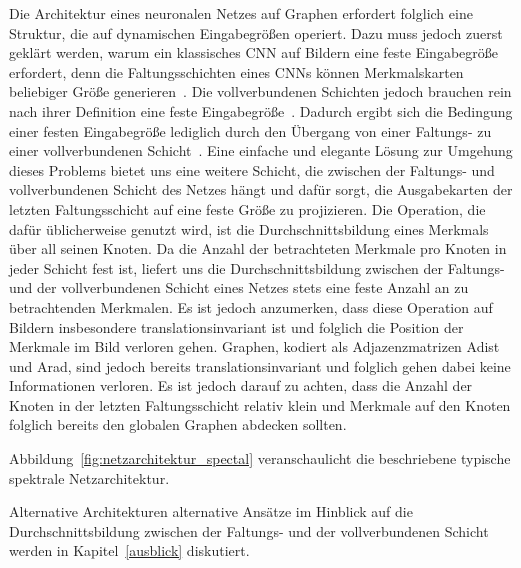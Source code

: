Die Architektur eines neuronalen Netzes auf Graphen erfordert folglich eine Struktur, die auf dynamischen Eingabegrößen operiert.
Dazu muss jedoch zuerst geklärt werden, warum ein klassisches \gls{CNN} auf Bildern eine feste Eingabegröße erfordert, denn die Faltungsschichten eines \glspl{CNN} können Merkmalskarten beliebiger Größe generieren~\cite{spp}.
Die vollverbundenen Schichten jedoch brauchen rein nach ihrer Definition eine feste Eingabegröße~\cite{spp}.
Dadurch ergibt sich die Bedingung einer festen Eingabegröße lediglich durch den Übergang von einer Faltungs- zu einer vollverbundenen Schicht~\cite{spp}.
Eine einfache und elegante Lösung zur Umgehung dieses Problems bietet uns eine weitere Schicht, die zwischen der Faltungs- und vollverbundenen Schicht des Netzes hängt und dafür sorgt, die Ausgabekarten der letzten Faltungsschicht auf eine feste Größe zu projizieren.
Die Operation, die dafür üblicherweise genutzt wird, ist die Durchschnittsbildung eines Merkmals über all seinen Knoten.
Da die Anzahl der betrachteten Merkmale pro Knoten in jeder Schicht fest ist, liefert uns die Durchschnittsbildung zwischen der Faltungs- und der vollverbundenen Schicht eines Netzes stets eine feste Anzahl an zu betrachtenden Merkmalen.
Es ist jedoch anzumerken, dass diese Operation auf Bildern insbesondere translationsinvariant ist und folglich die Position der Merkmale im Bild verloren gehen.
Graphen, kodiert als Adjazenzmatrizen \gls{Adist} und \gls{Arad}, sind jedoch bereits translationsinvariant und folglich gehen dabei keine Informationen verloren.
Es ist jedoch darauf zu achten, dass die Anzahl der Knoten in der letzten Faltungsschicht relativ klein und Merkmale auf den Knoten folglich bereits den globalen Graphen abdecken sollten.

Abbildung~\ref{fig:netzarchitektur_spectal} veranschaulicht die beschriebene typische spektrale Netzarchitektur.

Alternative Architekturen \bzw{} alternative Ansätze im Hinblick auf die Durchschnittsbildung zwischen der Faltungs- und der vollverbundenen Schicht werden in Kapitel~\ref{ausblick} diskutiert.
